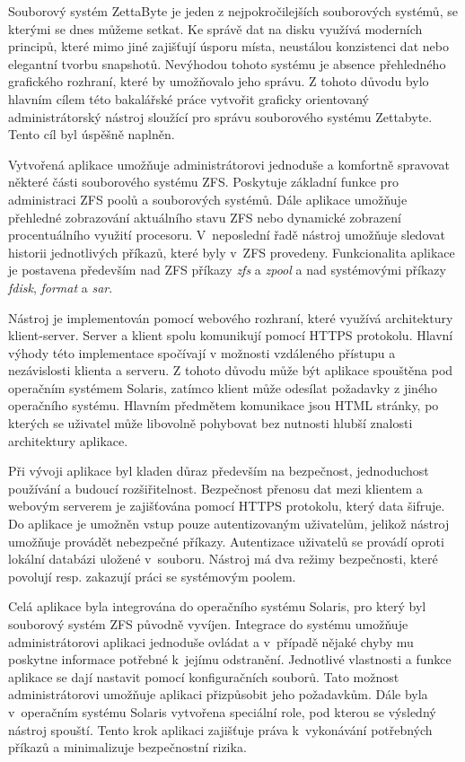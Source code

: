 Souborový systém ZettaByte je jeden z nejpokročilejších souborových systémů, se kterými se dnes můžeme setkat. Ke správě dat na disku využívá moderních principů, které mimo jiné zajišťují úsporu místa, neustálou konzistenci dat nebo elegantní tvorbu snapshotů. Nevýhodou tohoto systému je absence přehledného grafického rozhraní, které by umožňovalo jeho správu. Z tohoto důvodu bylo hlavním cílem této bakalářské práce vytvořit graficky orientovaný administrátorský nástroj sloužící pro správu souborového systému Zettabyte. Tento cíl byl úspěšně naplněn.

Vytvořená aplikace umožňuje administrátorovi jednoduše a komfortně spravovat některé části souborového systému ZFS. Poskytuje základní funkce pro administraci ZFS poolů a souborových systémů. Dále aplikace umožňuje přehledné zobrazování aktuálního stavu ZFS nebo dynamické zobrazení procentuálního využití procesoru. V~neposlední řadě nástroj umožňuje sledovat historii jednotlivých příkazů, které byly v~ZFS provedeny. Funkcionalita aplikace je postavena především nad ZFS příkazy \emph{zfs} a \emph{zpool} a nad systémovými příkazy \emph{fdisk}, \emph{format} a \emph{sar}.

Nástroj je implementován pomocí webového rozhraní, které využívá architektury klient-server. Server a klient spolu komunikují pomocí HTTPS protokolu. Hlavní výhody této implementace spočívají v možnosti vzdáleného přístupu a nezávislosti klienta a serveru. Z tohoto důvodu může být aplikace spouštěna pod operačním systémem Solaris, zatímco klient může odesílat požadavky z jiného operačního systému. Hlavním předmětem komunikace jsou HTML stránky, po kterých se uživatel může libovolně pohybovat bez nutnosti hlubší znalosti architektury aplikace.

Při vývoji aplikace byl kladen důraz především na bezpečnost, jednoduchost používání a budoucí rozšiřitelnost. Bezpečnost přenosu dat mezi klientem a webovým serverem je zajišťována pomocí HTTPS protokolu, který data šifruje. Do aplikace je umožněn vstup pouze autentizovaným uživatelům, jelikož nástroj umožňuje provádět nebezpečné příkazy. Autentizace uživatelů se provádí oproti lokální databázi uložené v~souboru. Nástroj má dva režimy bezpečnosti, které povolují resp. zakazují práci se systémovým poolem.

Celá aplikace byla integrována do operačního systému Solaris, pro který byl souborový systém ZFS původně vyvíjen. Integrace do systému umožňuje administrátorovi aplikaci jednoduše ovládat a v~případě nějaké chyby mu poskytne informace potřebné k~jejímu odstranění. Jednotlivé vlastnosti a funkce aplikace se dají nastavit pomocí konfiguračních souborů. Tato možnost administrátorovi umožňuje aplikaci přizpůsobit jeho požadavkům. Dále byla v~operačním systému Solaris vytvořena speciální role, pod kterou se výsledný nástroj spouští. Tento krok aplikaci zajišťuje práva k~vykonávání potřebných příkazů a minimalizuje bezpečnostní rizika.

